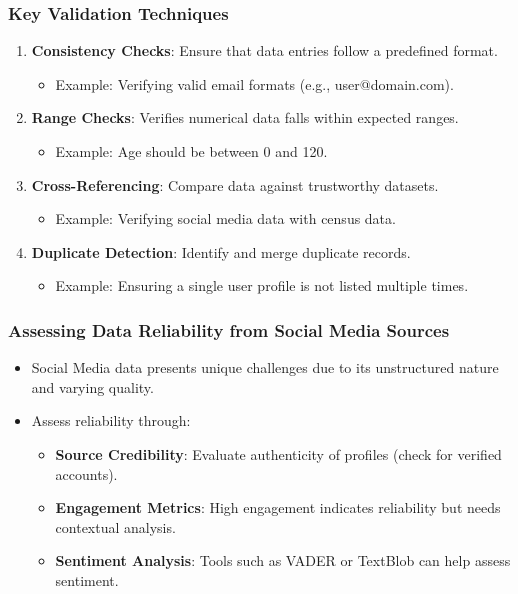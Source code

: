 \documentclass{beamer}
\begin{document}
\begin{frame}[fragile]
    \frametitle{Key Validation Techniques}
    \begin{enumerate}
        \item \textbf{Consistency Checks}: Ensure that data entries follow a predefined format.
        \begin{itemize}
            \item Example: Verifying valid email formats (e.g., user@domain.com).
        \end{itemize}
        \item \textbf{Range Checks}: Verifies numerical data falls within expected ranges.
        \begin{itemize}
            \item Example: Age should be between 0 and 120.
        \end{itemize}
        \item \textbf{Cross-Referencing}: Compare data against trustworthy datasets.
        \begin{itemize}
            \item Example: Verifying social media data with census data.
        \end{itemize}
        \item \textbf{Duplicate Detection}: Identify and merge duplicate records.
        \begin{itemize}
            \item Example: Ensuring a single user profile is not listed multiple times.
        \end{itemize}
    \end{enumerate}
\end{frame}

\begin{frame}[fragile]
    \frametitle{Assessing Data Reliability from Social Media Sources}
    \begin{itemize}
        \item Social Media data presents unique challenges due to its unstructured nature and varying quality.
        \item Assess reliability through:
        \begin{itemize}
            \item \textbf{Source Credibility}: Evaluate authenticity of profiles (check for verified accounts).
            \item \textbf{Engagement Metrics}: High engagement indicates reliability but needs contextual analysis.
            \item \textbf{Sentiment Analysis}: Tools such as VADER or TextBlob can help assess sentiment.
        \end{itemize}
    \end{itemize}
\end{frame}
\end{document}

